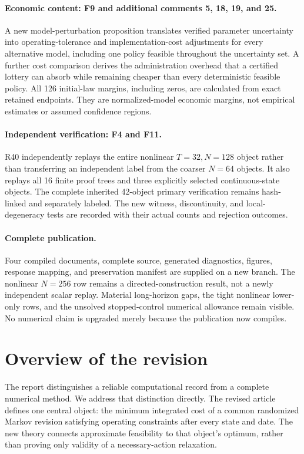 \paragraph{Economic content: F9 and additional comments 5, 18, 19, and 25.} A new model-perturbation proposition translates verified parameter uncertainty into operating-tolerance and implementation-cost adjustments for every alternative model, including one policy feasible throughout the uncertainty set. A further cost comparison derives the administration overhead that a certified lottery can absorb while remaining cheaper than every deterministic feasible policy. All 126 initial-law margins, including zeros, are calculated from exact retained endpoints. They are normalized-model economic margins, not empirical estimates or assumed confidence regions.

\paragraph{Independent verification: F4 and F11.} R40 independently replays the entire nonlinear $T=32,N=128$ object rather than transferring an independent label from the coarser $N=64$ objects. It also replays all 16 finite proof trees and three explicitly selected continuous-state objects. The complete inherited 42-object primary verification remains hash-linked and separately labeled. The new witness, discontinuity, and local-degeneracy tests are recorded with their actual counts and rejection outcomes.

\paragraph{Complete publication.} Four compiled documents, complete source, generated diagnostics, figures, response mapping, and preservation manifest are supplied on a new branch. The nonlinear $N=256$ row remains a directed-construction result, not a newly independent scalar replay. Material long-horizon gaps, the tight nonlinear lower-only rows, and the unsolved stopped-control numerical allowance remain visible. No numerical claim is upgraded merely because the publication now compiles.

\section{Overview of the revision}
The report distinguishes a reliable computational record from a complete numerical method. We address that distinction directly. The revised article defines one central object: the minimum integrated cost of a common randomized Markov revision satisfying operating constraints after every state and date. The new theory connects approximate feasibility to that object's optimum, rather than proving only validity of a necessary-action relaxation.

